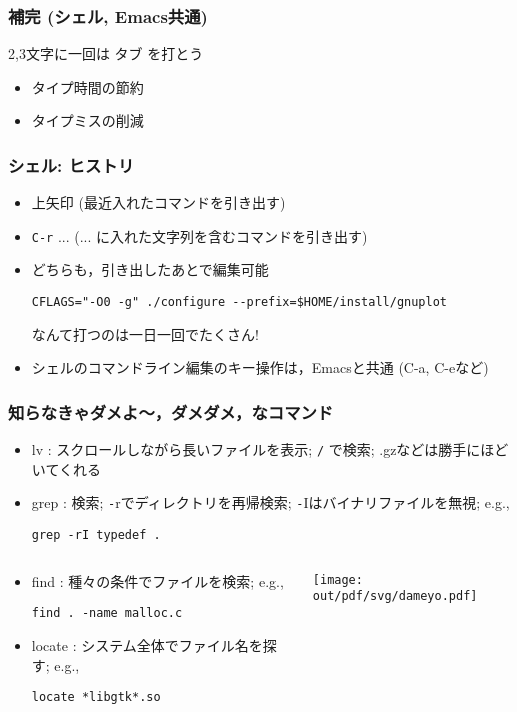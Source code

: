 \documentclass[12pt,dvipdfmx]{beamer}
\newcommand{\ao}[1]{{\color{blue}#1}}
\newcommand{\aka}[1]{{\color{red}#1}}
\begin{document}
\begin{frame}
\frametitle{補完 (シェル, Emacs共通)}
2,3文字に一回は {\huge タブ} を打とう

\begin{itemize}
\item タイプ時間の節約
\item \aka{タイプミスの削減}
\end{itemize}
\end{frame}

\begin{frame}[fragile]
\frametitle{シェル: ヒストリ}
\begin{itemize}
\item \ao{上矢印} (最近入れたコマンドを引き出す)
\item \texttt{\ao{C-r}} ... (... に入れた文字列を含むコマンドを引き出す)
\item どちらも，引き出したあとで\ao{編集可能}
\begin{lstlisting}
CFLAGS="-O0 -g" ./configure --prefix=$HOME/install/gnuplot
\end{lstlisting}%
なんて打つのは一日一回でたくさん!

\item シェルのコマンドライン編集のキー操作は，Emacsと共通
(C-a, C-eなど)

\end{itemize}
\end{frame}

\begin{frame}[fragile]
\frametitle{知らなきゃダメよ〜，ダメダメ，なコマンド}
\begin{itemize}
\item \aka{lv} : 
スクロールしながら長いファイルを表示; \aka{\texttt{/}} で検索;
.gzなどは勝手にほどいてくれる
\item \aka{grep} : 検索; \aka{\texttt -r}でディレクトリを再帰検索; 
\aka{\texttt -I}はバイナリファイルを無視; e.g.,
\begin{lstlisting}
grep -rI typedef .
\end{lstlisting}
\end{itemize}

\begin{columns}
  \begin{column}{0.75\textwidth}
\begin{itemize}
\item \aka{find} : 種々の条件でファイルを検索; e.g., 
\begin{lstlisting}
find . -name malloc.c
\end{lstlisting}
\item \aka{locate} : システム全体でファイル名を探す; e.g.,
\begin{lstlisting}
locate *libgtk*.so
\end{lstlisting}
\end{itemize}
\end{column}

\begin{column}{0.25\textwidth}
\texttt{[image: out/pdf/svg/dameyo.pdf]}
\end{column}
\end{columns}
\end{frame}
\end{document}
